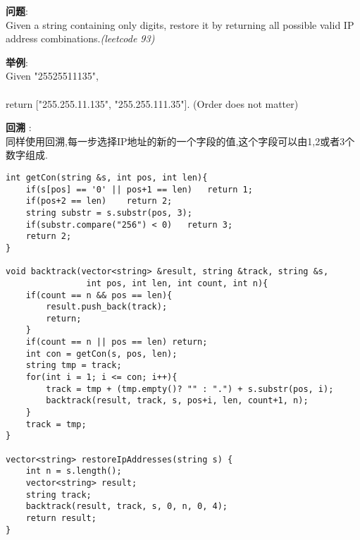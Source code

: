    
\begin{description}
    \item{\textbf{问题}}:\\
Given a string containing only digits, restore it by returning all possible valid IP address combinations.\textit{(leetcode 93)}
    \item{\textbf{举例}}:\\
Given "25525511135",\\
\\
return ["255.255.11.135", "255.255.111.35"]. (Order does not matter)
    \item{\textbf{回溯}} : 
    \\同样使用回溯,每一步选择IP地址的新的一个字段的值,这个字段可以由1,2或者3个数字组成.
    \begin{lstlisting}
int getCon(string &s, int pos, int len){
	if(s[pos] == '0' || pos+1 == len)	return 1;
	if(pos+2 == len)	return 2;
	string substr = s.substr(pos, 3);
	if(substr.compare("256") < 0)	return 3;
	return 2;
}

void backtrack(vector<string> &result, string &track, string &s,
				int pos, int len, int count, int n){
	if(count == n && pos == len){
		result.push_back(track);
		return;
	}
	if(count == n || pos == len) return;
	int con = getCon(s, pos, len);
	string tmp = track;
	for(int i = 1; i <= con; i++){
		track = tmp + (tmp.empty()? "" : ".") + s.substr(pos, i);
		backtrack(result, track, s, pos+i, len, count+1, n);
	}
	track = tmp;
}

vector<string> restoreIpAddresses(string s) {
	int n = s.length();
	vector<string> result;	
	string track;
	backtrack(result, track, s, 0, n, 0, 4);
	return result;
}
    \end{lstlisting}
\end{description}
